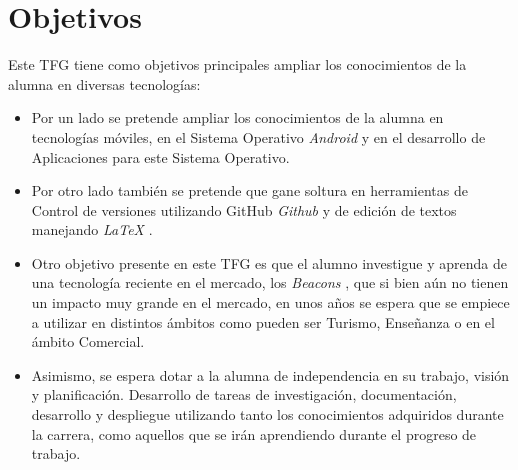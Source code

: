 %
%
%
%


\chapter{Objetivos} \label{chap:objetives}  

Este TFG tiene como objetivos principales ampliar los conocimientos de la alumna en diversas tecnologías:

	
\begin{itemize}
\item  	Por un lado se pretende ampliar los conocimientos de la alumna en tecnologías móviles, en el Sistema Operativo \textit{Android} \cite{URL::Android} y en el desarrollo de Aplicaciones para este Sistema Operativo.
\item Por otro lado también se pretende que gane soltura en herramientas de Control de versiones utilizando GitHub \textit{Github} \cite{URL::Github} y de edición de textos manejando \textit{LaTeX}  \cite{URL::LaTeX}.
\item Otro objetivo presente en este TFG es que el alumno investigue y aprenda de una tecnología reciente en el mercado, los \textit{Beacons} \cite{URL::Beacon} , que si bien aún no tienen un impacto muy grande en el mercado, en unos años se espera que se empiece a utilizar en distintos ámbitos como pueden ser Turismo, Enseñanza o en el ámbito Comercial.
\item  Asimismo, se espera dotar a la alumna de independencia en su trabajo, visión y planificación. Desarrollo de tareas de investigación, documentación, desarrollo y despliegue utilizando tanto los conocimientos adquiridos durante la carrera, como aquellos que se irán aprendiendo durante el progreso de trabajo.
\end{itemize}


